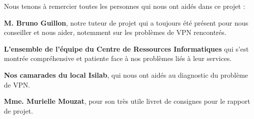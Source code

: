 Nous tenons à remercier toutes les personnes qui nous ont aidés dans ce projet :

\textbf{M. Bruno Guillon}, notre tuteur de projet qui a toujours été présent pour nous conseiller et nous aider, notemment sur les problèmes de VPN
rencontrés.

\textbf{L'ensemble de l'équipe du Centre de Ressources Informatiques} qui s'est montrée compréhensive et patiente face à nos problèmes liés à leur
services.

\textbf{Nos camarades du local Isilab}, qui nous ont aidés au diagnostic du problème de VPN.

\textbf{Mme. Murielle Mouzat}, pour son très utile livret de consignes pour le rapport de projet.